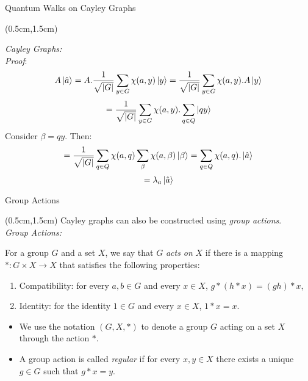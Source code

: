 \documentclass{beamer}
\theoremstyle{definition}
\begin{document}
\begin{frame}{Quantum Walks on Cayley Graphs}
    
    \begin{textblock*}{12cm}(0.5cm,1.5cm)
        
        \textit{Cayley Graphs:} \\
        \vspace{0.3cm}
        \textit{Proof}:
        \[
        A\ket{\hat{a}} = A.\frac{1}{\sqrt{|G|}}\sum_{y \in G}\chi(a,y)\ket{y} = \frac{1}{\sqrt{|G|}}\sum_{y \in G}\chi(a,y).A\ket{y}
        \]
        \[
        = \frac{1}{\sqrt{|G|}}\sum_{y \in G}\chi(a,y).\sum_{q \in Q}\ket{qy}
        \]
        Consider $\beta = qy$. Then:
        \[
         = \frac{1}{\sqrt{|G|}}\sum_{q \in Q}\chi(a,q)\sum_{\beta}\chi(a,\beta)\ket{\beta} = \sum_{q \in Q}\chi(a,q) . \ket{\hat{a}}
        \]
        \[
         = \lambda_a\ket{\hat{a}}
        \]
    \end{textblock*}
\end{frame}




\begin{frame}{Group Actions}
    
    \begin{textblock*}{12cm}(0.5cm,1.5cm)
        Cayley graphs can also be constructed using \textit{group actions}.\\
        \vspace{0.5cm}
        \textit{Group Actions:}
        \vspace{0.5cm}
                
        For a group $G$ and a set $X$, we say that $G$ \textit{acts on} $X$ if there is a mapping $*: G \times X \to X$ that satisfies the following properties:
        \begin{enumerate}
            \item Compatibility: for every $a, b \in G$ and every $x \in X$, $g * (h * x) = (gh) * x$,
            \item Identity: for the identity $1 \in G$ and every $x \in X$, $1 * x = x$. 
        \end{enumerate}

        \vspace{0.5 cm}
        \begin{itemize}
            \item  We use the notation $(G, X, *)$ to denote a group $G$ acting on a set $X$ through the action $*$.
            \item  A group action is called \textit{regular} if for every $x, y \in X$ there exists a unique $g \in G$ such that $g * x = y$.
        \end{itemize}


    \end{textblock*}

\end{frame}
\end{document}
